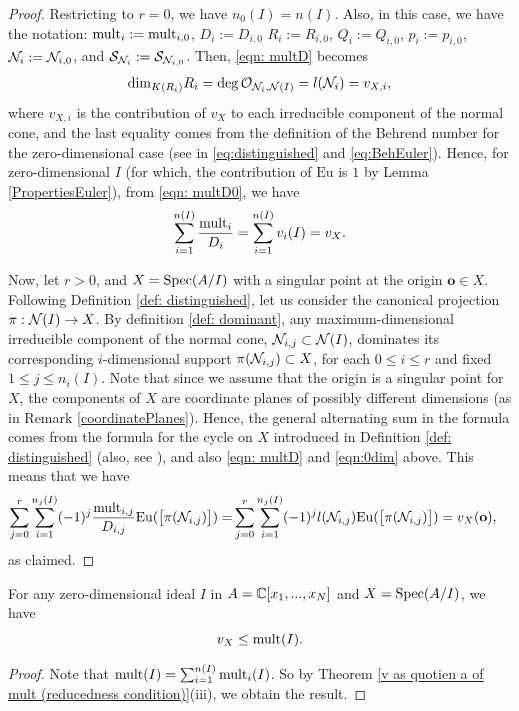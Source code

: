 \documentclass[11pt,a4paper,leqno,noamsfonts]{amsart}
\numberwithin{equation}{section}
\begin{document}
\begin{proof}
Restricting to $r=0$, we have $n_0(I)=n(I)$. Also, in this case, we have the notation: $\mathrm{mult}_i:=\mathrm{mult}_{i,0}$, $D_i:=D_{i,0}$ $R_i:=R_{i,0}$, $Q_i:=Q_{i,0}$, $p_i:=p_{i,0}$, ${\mathcal N}_i:={\mathcal N}_{i,0}$, and  ${\mathcal S}_{{\mathcal N}_i}:={\mathcal S}_{{\mathcal N}_{i,0}}$. Then, \eqref{eqn: multD} becomes
\begin{align} \label{eqn: multD0}
\mathrm{dim}_{K(R_i)}R_i=\deg {\mathcal O}_{{\mathcal N}_{i},{\mathcal N}(I)}=l({\mathcal N}_{i})=v_{X,i},
\end{align}
where $v_{X,i}$ is the contribution of $v_X$ to each irreducible component of the normal cone, and the last equality comes from the definition of the Behrend number for the zero-dimensional case (see in  \eqref{eq:distinguished} and \eqref{eq:BehEuler}).  Hence, for zero-dimensional $I$ (for which, the contribution of $\mathrm{Eu}$ is $1$ by Lemma \ref{PropertiesEuler}), from \eqref{eqn: multD0}, we have
\begin{align}\label{eqn:0dim}
\sum_{i=1}^{n(I)}\frac{\mathrm{mult}_i}{D_i}
=\sum_{i=1}^{n(I)}v_i(I)=v_X.
\end{align}


Now, let $r>0$, and $X=\operatorname{Spec}(A/I)$ with a singular point at the origin $\mathbf{o}\in X$.
Following Definition \ref{def: distinguished}, let us consider the canonical projection $\pi: {\mathcal N}(I) \to X$. By definition \ref{def: dominant}, any maximum-dimensional irreducible component of the normal cone, ${\mathcal N}_{i,j}\subset {\mathcal N}(I)$, dominates its corresponding $i$-dimensional support $\pi({\mathcal N}_{i,j})\subset X$, for each $0\leq i \leq r$ and fixed $1\leq j \leq n_i(I)$. Note that since we assume that the origin is a singular point for $X$, the components of $X$ are coordinate planes of possibly different dimensions (as in Remark \ref{coordinatePlanes}).  Hence, the general alternating sum in the formula comes from the formula for the cycle on $X$ introduced in Definition \ref{def: distinguished} (also, see \cite[Section 2.2]{RicolfiSign}), and also  \eqref{eqn: multD} and \eqref{eqn:0dim} above. This means that we have
\begin{align*}
\sum_{j=0}^{r} \sum_{i=1}^{n_j(I)}(-1)^j\frac{\mathrm{mult}_{i,j}}{D_{i,j}}\mathrm{Eu}(\big[\pi({\mathcal N}_{i,j})\big])=&\sum_{j=0}^{r}\sum_{i=1}^{n_j(I)}(-1)^j l({\mathcal N}_{i,j})\mathrm{Eu}(\big[\pi({\mathcal N}_{i,j})\big])=  v_X(\mathbf{o}),
\end{align*}
as claimed.


\end{proof}

\begin{corollary}
For any zero-dimensional ideal $I$ in $A={\mathbb{C}}[x_1,...,x_N]$ and $X=\operatorname{Spec}(A/I)$, we have $$v_X\leq \mathrm{mult} (I).$$
\end{corollary}
\begin{proof}
Note that $\mathrm{mult}(I)=\sum_{i=1}^{n(I)}\mathrm{mult}_i(I)$. So by Theorem \ref{v as quotien a of mult (reducedness condition)}(iii), we obtain the result.
\end{proof}
\end{document}
